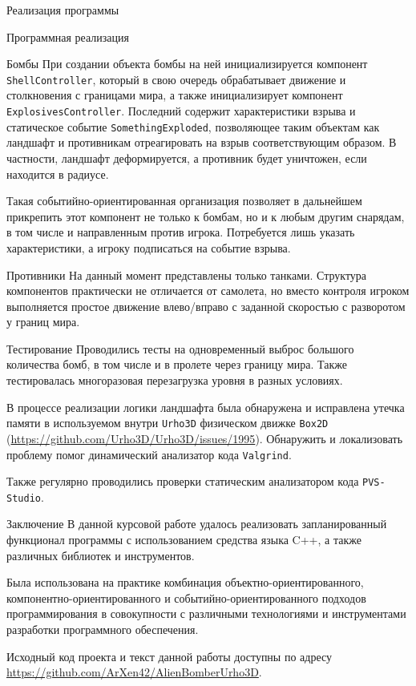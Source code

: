 \documentclass[a4paper, 14pt]{extarticle}
\begin{document}
\begin{section}{Реализация программы}
\begin{subsection}{Программная реализация}
\begin{subsubsection}{Бомбы}
При создании объекта бомбы на ней инициализируется компонент \verb|ShellController|, который в свою очередь обрабатывает движение и столкновения с границами мира, а также инициализирует компонент \verb|ExplosivesController|.
Последний содержит характеристики взрыва и статическое событие \verb|SomethingExploded|, позволяющее таким объектам как ландшафт и противникам отреагировать на взрыв соответствующим образом.
В частности, ландшафт деформируется, а противник будет уничтожен, если находится в радиусе.

Такая событийно-ориентированная организация позволяет в дальнейшем прикрепить этот компонент не только к бомбам, но и к любым другим снарядам, в том числе и направленным против игрока.
Потребуется лишь указать характеристики, а игроку подписаться на событие взрыва.
\end{subsubsection}

\begin{subsubsection}{Противники}
На данный момент представлены только танками.
Структура компонентов практически не отличается от самолета, но вместо контроля игроком выполняется простое движение влево/вправо с заданной скоростью с разворотом у границ мира.
\end{subsubsection}
\end{subsection}

\begin{subsection}{Тестирование}
Проводились тесты на одновременный выброс большого количества бомб, в том числе и в пролете через границу мира.
Также тестировалась многоразовая перезагрузка уровня в разных условиях.

В процессе реализации логики ландшафта была обнаружена и исправлена утечка памяти в используемом внутри \verb|Urho3D| физическом движке \verb|Box2D| (\url{https://github.com/Urho3D/Urho3D/issues/1995}).
Обнаружить и локализовать проблему помог динамический анализатор кода \verb|Valgrind|.

Также регулярно проводились проверки статическим анализатором кода \verb|PVS-Studio|.
\end{subsection}

\end{section}

\begin{section}{Заключение}
В данной курсовой работе удалось реализовать запланированный функционал программы с использованием средства языка C++, а также различных библиотек и инструментов.

Была использована на практике комбинация объектно-ориентированного, компонентно-ориентированного и событийно-ориентированного подходов программирования в совокупности с различными технологиями и инструментами разработки программного обеспечения.

Исходный код проекта и текст данной работы доступны по адресу \url{https://github.com/ArXen42/AlienBomberUrho3D}.
\end{section}

~\nocite{urho3d-docs,cppreference, teplyakov}
\printbibliography[title = Список использованных источников]
\end{document}
